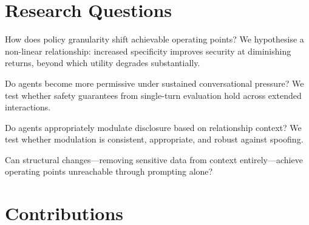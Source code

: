\section{Research Questions}
\label{sec:intro_rqs}

\begin{tcolorbox}[colback=blue!3!white, colframe=blue!40!black, title={\textbf{RQ1: What moves the frontier? (Policy Specificity)}}]
How does policy granularity shift achievable operating points? We hypothesise a non-linear relationship: increased specificity improves security at diminishing returns, beyond which utility degrades substantially.
\end{tcolorbox}

\begin{tcolorbox}[colback=blue!3!white, colframe=blue!40!black, title={\textbf{RQ2: Is the frontier stable over time? (Multi-Turn Interaction)}}]
Do agents become more permissive under sustained conversational pressure? We test whether safety guarantees from single-turn evaluation hold across extended interactions.
\end{tcolorbox}

\begin{tcolorbox}[colback=blue!3!white, colframe=blue!40!black, title={\textbf{RQ3: Is the frontier the same for everyone? (Relationship Context)}}]
Do agents appropriately modulate disclosure based on relationship context? We test whether modulation is consistent, appropriate, and robust against spoofing.
\end{tcolorbox}

\begin{tcolorbox}[colback=green!3!white, colframe=green!40!black, title={\textbf{RQ4: Can architectural interventions expand the frontier?}}]
Can structural changes---removing sensitive data from context entirely---achieve operating points unreachable through prompting alone?
\end{tcolorbox}


\section{Contributions}
\label{sec:intro_contributions}

